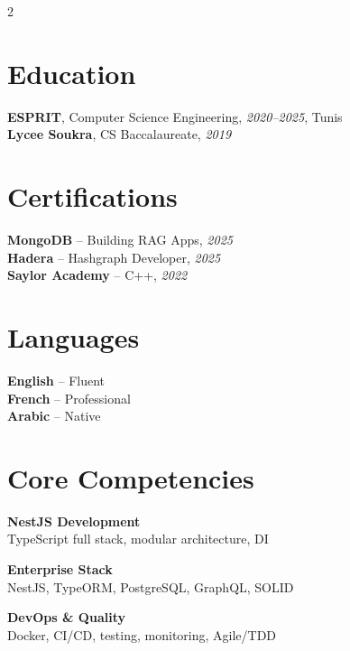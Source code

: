 \documentclass[10pt,a4paper]{article}
\begin{document}
\vspace{6pt}
\begin{multicols}{2}

\section*{Education}
{\small
\textbf{ESPRIT}, Computer Science Engineering, \textit{2020--2025}, Tunis\\[1pt]
\textbf{Lycee Soukra}, CS Baccalaureate, \textit{2019}
}

\vspace{3pt}
\section*{Certifications}
{\small
\textbf{MongoDB} -- Building RAG Apps, \textit{2025}\\[1pt]
\textbf{Hadera} -- Hashgraph Developer, \textit{2025}\\[1pt]
\textbf{Saylor Academy} -- C++, \textit{2022}
}

\columnbreak

\section*{Languages}
{\small
\textbf{English} -- Fluent\\[1pt]
\textbf{French} -- Professional\\[1pt]
\textbf{Arabic} -- Native
}

\vspace{3pt}
\section*{Core Competencies}
{\small
\textbf{NestJS Development}\\[1pt]
TypeScript full stack, modular architecture, DI

\vspace{4pt}
\textbf{Enterprise Stack}\\[1pt]
NestJS, TypeORM, PostgreSQL, GraphQL, SOLID

\vspace{4pt}
\textbf{DevOps \& Quality}\\[1pt]
Docker, CI/CD, testing, monitoring, Agile/TDD
}

\end{multicols}
\end{document}
